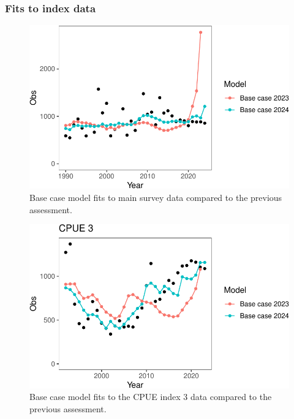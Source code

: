\documentclass[
  letterpaper,
  DIV=11,
  numbers=noendperiod]{scrartcl}
\begin{document}
\subsubsection{Fits to index data}\label{fits-to-index-data}

\begin{figure}[H]

{\centering \includegraphics{00-Namibian_hake_model_2024_files/figure-pdf/fitidx1-1.pdf}

}

\caption{Base case model fits to main survey data compared to the
previous assessment.}

\end{figure}%

\begin{figure}[H]

{\centering \includegraphics{00-Namibian_hake_model_2024_files/figure-pdf/fitcpue3-1.pdf}

}

\caption{Base case model fits to the CPUE index 3 data compared to the
previous assessment.}

\end{figure}%
\end{document}
